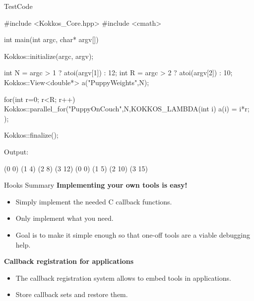 \begin{frame}[fragile]{TestCode}
\begin{code}[keywords={int,uint64_t,extern,void,const,char,void,parallel_for,for,initialize,finalize}]
#include <Kokkos_Core.hpp>
#include <cmath>

int main(int argc, char* argv[]) {
  Kokkos::initialize(argc, argv);
  {
    int N = argc > 1 ? atoi(argv[1]) : 12;
    int R = argc > 2 ? atoi(argv[2]) : 10;
    Kokkos::View<double*> a("PuppyWeights",N);

    for(int r=0; r<R; r++) {
      Kokkos::parallel_for("PuppyOnCouch",N,KOKKOS_LAMBDA(int i)
                           { a(i) = i*r; });
    }
  }
  Kokkos::finalize();
}
\end{code}

Output:
\begin{code}
(0 0) (1 4) (2 8) (3 12)
(0 0) (1 5) (2 10) (3 15)
\end{code}
\end{frame}

\begin{frame}[fragile]{Hooks Summary}
\textbf{Implementing your own tools is easy!}
\begin{itemize}
  \item Simply implement the needed C callback functions.
  \item Only implement what you need.
  \item Goal is to make it simple enough so that one-off tools are a viable debugging help.
\end{itemize}

\vspace{10pt}
\textbf{Callback registration for applications}
\begin{itemize}
  \item The callback registration system allows to embed tools in applications.
  \item Store callback sets and restore them.
\end{itemize}

\end{frame}

